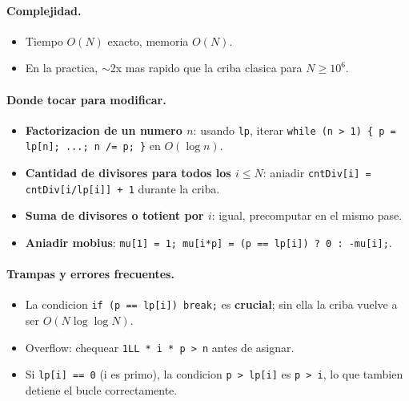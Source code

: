 \paragraph{Complejidad.}
\begin{itemize}\setlength\itemsep{0pt}
	\item Tiempo $O(N)$ exacto, memoria $O(N)$.
	\item En la practica, $\sim$2x mas rapido que la criba clasica para $N \ge 10^6$.
\end{itemize}

\paragraph{Donde tocar para modificar.}
\begin{itemize}\setlength\itemsep{0pt}
	\item \textbf{Factorizacion de un numero $n$}: usando \texttt{lp}, iterar \texttt{while (n > 1) \{ p = lp[n]; ...; n /= p; \}} en $O(\log n)$.
	\item \textbf{Cantidad de divisores para todos los $i \le N$}: aniadir \texttt{cntDiv[i] = cntDiv[i/lp[i]] + 1} durante la criba.
	\item \textbf{Suma de divisores o totient por $i$}: igual, precomputar en el mismo pase.
	\item \textbf{Aniadir mobius}: \texttt{mu[1] = 1; mu[i*p] = (p == lp[i]) ? 0 : -mu[i];}.
\end{itemize}

\paragraph{Trampas y errores frecuentes.}
\begin{itemize}\setlength\itemsep{0pt}
	\item La condicion \texttt{if (p == lp[i]) break;} es \textbf{crucial}; sin ella la criba vuelve a ser $O(N \log \log N)$.
	\item Overflow: chequear \texttt{1LL * i * p > n} antes de asignar.
	\item Si \texttt{lp[i] == 0} (i es primo), la condicion \texttt{p > lp[i]} es \texttt{p > i}, lo que tambien detiene el bucle correctamente.
\end{itemize}

